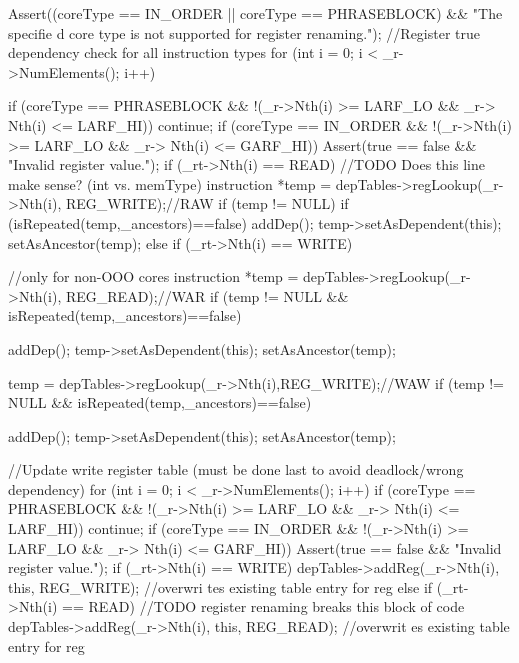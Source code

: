 \begin{DoxyCode}
                                                                               {
        Assert((coreType == IN_ORDER || coreType == PHRASEBLOCK) && "The specifie
      d core type is not supported for register renaming.");
        //Register true dependency check for all instruction types
        for (int i = 0; i < _r->NumElements(); i++) {
                if (coreType == PHRASEBLOCK && !(_r->Nth(i) >= LARF_LO && _r->
      Nth(i) <= LARF_HI)) continue;
                if (coreType == IN_ORDER    && !(_r->Nth(i) >= LARF_LO && _r->
      Nth(i) <= GARF_HI)) Assert(true == false && "Invalid register value.");
                if (_rt->Nth(i) == READ) { //TODO Does this line make sense? (int
       vs. memType)
                        instruction *temp = depTables->regLookup(_r->Nth(i),
      REG_WRITE);//RAW
                        if (temp != NULL) {
                                if (isRepeated(temp,_ancestors)==false) {
                                        addDep();
                                        temp->setAsDependent(this);
                                        setAsAncestor(temp);
                                }
                        }
                } else if (_rt->Nth(i) == WRITE) {
                        //only for non-OOO cores
                        instruction *temp = depTables->regLookup(_r->Nth(i),
      REG_READ);//WAR
                        if (temp != NULL && isRepeated(temp,_ancestors)==false) {
      
                                addDep();
                                temp->setAsDependent(this);
                                setAsAncestor(temp);
                        }
                        temp = depTables->regLookup(_r->Nth(i),REG_WRITE);//WAW
                        if (temp != NULL && isRepeated(temp,_ancestors)==false) {
      
                                addDep();
                                temp->setAsDependent(this);
                                setAsAncestor(temp);
                        }
                }
        }
        //Update write register table (must be done last to avoid deadlock/wrong 
      dependency)
        for (int i = 0; i < _r->NumElements(); i++) {
                if (coreType == PHRASEBLOCK && !(_r->Nth(i) >= LARF_LO && _r->
      Nth(i) <= LARF_HI)) continue;
                if (coreType == IN_ORDER    && !(_r->Nth(i) >= LARF_LO && _r->
      Nth(i) <= GARF_HI)) Assert(true == false && "Invalid register value.");
                if (_rt->Nth(i) == WRITE) {
                        depTables->addReg(_r->Nth(i), this, REG_WRITE); //overwri
      tes existing table entry for reg
                } else if (_rt->Nth(i) == READ) { //TODO register renaming breaks
       this block of code
                        depTables->addReg(_r->Nth(i), this, REG_READ); //overwrit
      es existing table entry for reg
                }
        }
}
\end{DoxyCode}


